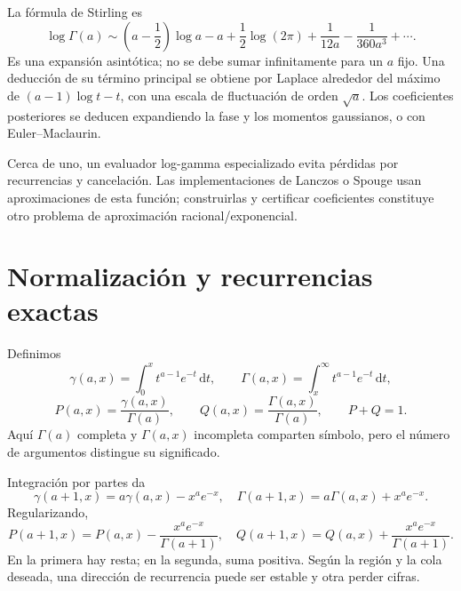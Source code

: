 \documentclass[11pt,a4paper]{article}
\newcommand{\dd}{\,\mathrm d}
\theoremstyle{definition}
\newcounter{problema}
\begin{document}
La fórmula de Stirling es
\[
\log\Gamma(a)\sim
\left(a-\frac12\right)\log a-a+\frac12\log(2\pi)
+\frac1{12a}-\frac1{360a^3}+\cdots.
\]
Es una expansión asintótica; no se debe sumar infinitamente para un $a$ fijo. Una deducción de su término principal se obtiene por Laplace alrededor del máximo de $(a-1)\log t-t$, con una escala de fluctuación de orden $\sqrt a$. Los coeficientes posteriores se deducen expandiendo la fase y los momentos gaussianos, o con Euler--Maclaurin.

Cerca de uno, un evaluador log-gamma especializado evita pérdidas por recurrencias y cancelación. Las implementaciones de Lanczos o Spouge usan aproximaciones de esta función; construirlas y certificar coeficientes constituye otro problema de aproximación racional/exponencial.

\section{Normalización y recurrencias exactas}
Definimos
\[
\gamma(a,x)=\int_0^x t^{a-1}e^{-t}\dd t,\qquad
\Gamma(a,x)=\int_x^\infty t^{a-1}e^{-t}\dd t,
\]
\[
P(a,x)=\frac{\gamma(a,x)}{\Gamma(a)},\qquad
Q(a,x)=\frac{\Gamma(a,x)}{\Gamma(a)},\qquad P+Q=1.
\]
Aquí $\Gamma(a)$ completa y $\Gamma(a,x)$ incompleta comparten símbolo, pero el número de argumentos distingue su significado.

Integración por partes da
\[
\gamma(a+1,x)=a\gamma(a,x)-x^ae^{-x},
\quad
\Gamma(a+1,x)=a\Gamma(a,x)+x^ae^{-x}.
\]
Regularizando,
\[
P(a+1,x)=P(a,x)-\frac{x^ae^{-x}}{\Gamma(a+1)},\quad
Q(a+1,x)=Q(a,x)+\frac{x^ae^{-x}}{\Gamma(a+1)}.
\]
En la primera hay resta; en la segunda, suma positiva. Según la región y la cola deseada, una dirección de recurrencia puede ser estable y otra perder cifras.
\end{document}
